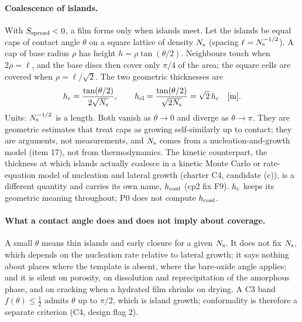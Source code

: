 \paragraph{Coalescence of islands.} With $S_\mathrm{spread}<0$, a film forms only when islands meet. Let the
islands be equal caps of contact angle $\theta$ on a square lattice of density $N_\mathrm{s}$ (spacing
$\ell=N_\mathrm{s}^{-1/2}$). A cap of base radius $\rho$ has height $h=\rho\tan(\theta/2)$. Neighbours touch
when $2\rho=\ell$, and the base discs then cover only $\pi/4$ of the area; the square cells are
covered when $\rho=\ell/\sqrt2$. The two geometric thicknesses are
\begin{equation}\label{th:eq:hc}
h_\mathrm{c}=\frac{\tan(\theta/2)}{2\sqrt{N_\mathrm{s}}},\qquad
h_\mathrm{cl}=\frac{\tan(\theta/2)}{\sqrt{2N_\mathrm{s}}}=\sqrt2\,h_\mathrm{c} \quad[\mathrm{m}].
\end{equation}
Units: $N_\mathrm{s}^{-1/2}$ is a length. Both vanish as $\theta\to0$ and diverge as $\theta\to\pi$. They
are geometric estimates that treat caps as growing self-similarly up to contact; they are
arguments, not measurements, and $N_\mathrm{s}$ comes from a nucleation-and-growth model (item 17), not
from thermodynamics. The kinetic counterpart, the thickness at which islands actually coalesce in a
kinetic Monte Carlo or rate-equation model of nucleation and lateral growth (charter C4,
candidate (c)), is a different quantity and carries its own name, $h_\mathrm{coal}$ (cp2 fix F9). $h_\mathrm{c}$
keeps its geometric meaning throughout; P0 does not compute $h_\mathrm{coal}$.

\paragraph{What a contact angle does and does not imply about coverage.} A small $\theta$ means
thin islands and early closure for a given $N_\mathrm{s}$. It does not fix $N_\mathrm{s}$, which depends on the
nucleation rate relative to lateral growth; it says nothing about places where the template is
absent, where the bare-oxide angle applies; and it is silent on porosity, on dissolution and
reprecipitation of the amorphous phase, and on cracking when a hydrated film shrinks on drying.
A C3 band $f(\theta)\le\tfrac12$ admits $\theta$ up to $\pi/2$, which is island growth;
conformality is therefore a separate criterion (C4, design flag 2).

